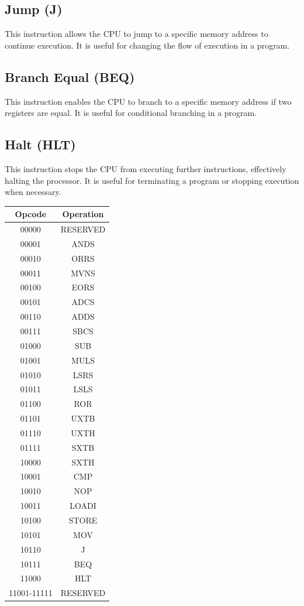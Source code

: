 \documentclass[9pt,a4paper,twoside]{tau}
\begin{document}
    
        \subsection{Jump (J)}
        This instruction allows the CPU to jump to a specific memory address to continue execution. It is useful for changing the flow of execution in a program. 
        \subsection{Branch Equal (BEQ)}
        This instruction enables the CPU to branch to a specific memory address if two registers are equal. It is useful for conditional branching in a program. 
        \subsection{Halt (HLT)}
        This instruction stops the CPU from executing further instructions, effectively halting the processor. It is useful for terminating a program or stopping execution when necessary.


        \begingroup
        {\centering
        \begin{tabular}{c|c}
        \textbf{Opcode} & \textbf{Operation} \\ \hline
        00000 & RESERVED \\
        00001 & ANDS \\
        00010 & ORRS \\
        00011 & MVNS \\
        00100 & EORS \\
        00101 & ADCS \\
        00110 & ADDS \\
        00111 & SBCS \\
        01000 & SUB \\
        01001 & MULS \\
        01010 & LSRS \\
        01011 & LSLS \\
        01100 & ROR \\
        01101 & UXTB \\
        01110 & UXTH \\
        01111 & SXTB \\
        10000 & SXTH \\
        10001 & CMP \\
        10010 & NOP \\
        10011 & LOADI \\
        10100 & STORE \\
        10101 & MOV \\
        10110 & J \\
        10111 & BEQ \\
        11000 & HLT \\
        11001-11111 & RESERVED \\
        \end{tabular}}
\end{document}
